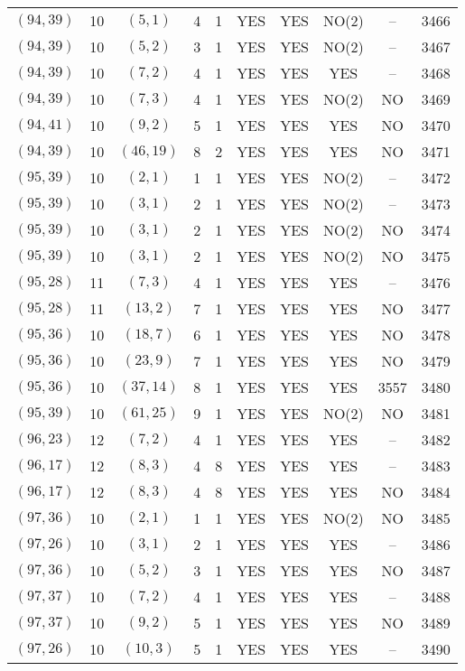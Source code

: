 \begin{longtable}{|c|c|c|c|c|c|c|c|c|c|}
$(94, 39)$ & 10 & $(5, 1)$ & 4 & 1 & YES & YES & NO(2) & -- & 3466\\
$(94, 39)$ & 10 & $(5, 2)$ & 3 & 1 & YES & YES & NO(2) & -- & 3467\\
$(94, 39)$ & 10 & $(7, 2)$ & 4 & 1 & YES & YES & YES & -- & 3468\\
$(94, 39)$ & 10 & $(7, 3)$ & 4 & 1 & YES & YES & NO(2) & NO & 3469\\
$(94, 41)$ & 10 & $(9, 2)$ & 5 & 1 & YES & YES & YES & NO & 3470\\
$(94, 39)$ & 10 & $(46, 19)$ & 8 & 2 & YES & YES & YES & NO & 3471\\
$(95, 39)$ & 10 & $(2, 1)$ & 1 & 1 & YES & YES & NO(2) & -- & 3472\\
$(95, 39)$ & 10 & $(3, 1)$ & 2 & 1 & YES & YES & NO(2) & -- & 3473\\
$(95, 39)$ & 10 & $(3, 1)$ & 2 & 1 & YES & YES & NO(2) & NO & 3474\\
$(95, 39)$ & 10 & $(3, 1)$ & 2 & 1 & YES & YES & NO(2) & NO & 3475\\
$(95, 28)$ & 11 & $(7, 3)$ & 4 & 1 & YES & YES & YES & -- & 3476\\
$(95, 28)$ & 11 & $(13, 2)$ & 7 & 1 & YES & YES & YES & NO & 3477\\
$(95, 36)$ & 10 & $(18, 7)$ & 6 & 1 & YES & YES & YES & NO & 3478\\
$(95, 36)$ & 10 & $(23, 9)$ & 7 & 1 & YES & YES & YES & NO & 3479\\
$(95, 36)$ & 10 & $(37, 14)$ & 8 & 1 & YES & YES & YES & 3557 & 3480\\
$(95, 39)$ & 10 & $(61, 25)$ & 9 & 1 & YES & YES & NO(2) & NO & 3481\\
$(96, 23)$ & 12 & $(7, 2)$ & 4 & 1 & YES & YES & YES & -- & 3482\\
$(96, 17)$ & 12 & $(8, 3)$ & 4 & 8 & YES & YES & YES & -- & 3483\\
$(96, 17)$ & 12 & $(8, 3)$ & 4 & 8 & YES & YES & YES & NO & 3484\\
$(97, 36)$ & 10 & $(2, 1)$ & 1 & 1 & YES & YES & NO(2) & NO & 3485\\
$(97, 26)$ & 10 & $(3, 1)$ & 2 & 1 & YES & YES & YES & -- & 3486\\
$(97, 36)$ & 10 & $(5, 2)$ & 3 & 1 & YES & YES & YES & NO & 3487\\
$(97, 37)$ & 10 & $(7, 2)$ & 4 & 1 & YES & YES & YES & -- & 3488\\
$(97, 37)$ & 10 & $(9, 2)$ & 5 & 1 & YES & YES & YES & NO & 3489\\
$(97, 26)$ & 10 & $(10, 3)$ & 5 & 1 & YES & YES & YES & -- & 3490\\

\end{longtable}
